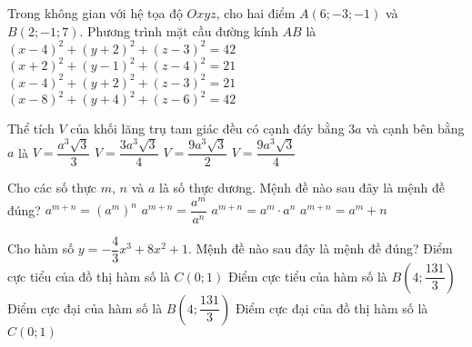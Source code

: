 \begin{ex}%
Trong không gian với hệ tọa độ $Oxyz$, cho hai điểm $A(6;-3;-1)$ và $B(2;-1;7)$. Phương trình mặt cầu đường kính $AB$ là
\choice
{$(x-4)^2+(y+2)^2+(z-3)^2=42$}
{$(x+2)^2+(y-1)^2+(z-4)^2=21$}
{\True $(x-4)^2+(y+2)^2+(z-3)^2=21$}
{$(x-8)^2+(y+4)^2+(z-6)^2=42$}
\end{ex}

\begin{ex}%
Thể tích $V$ của khối lăng trụ tam giác đều có cạnh đáy bằng $3a$ và cạnh bên bằng $a$ là
\choice
{$V=\dfrac{a^3\sqrt{3}}{3}$}
{$V=\dfrac{3a^3\sqrt{3}}{4}$}
{$V=\dfrac{9a^3\sqrt{3}}{2}$}
{\True $V=\dfrac{9a^3\sqrt{3}}{4}$}
\end{ex}

\begin{ex}%
	Cho các số thực $m$, $n$ và $a$ là số thực dương. Mệnh đề nào sau đây là mệnh đề đúng?
	\choice
	{$a^{m+n}=\left(a^m\right)^n$}
	{$a^{m+n}=\dfrac{a^m}{a^n}$}
	{\True $a^{m+n}=a^m\cdot a^n$}
	{$a^{m+n}=a^m+n$}
\end{ex}

\begin{ex}%
	Cho hàm số $y=-\dfrac{4}{3}x^3+8x^2+1$. Mệnh đề nào sau đây là mệnh đề đúng?
	\choice
	{\True Điểm cực tiểu của đồ thị hàm số là $C(0;1)$}
	{Điểm cực tiểu của hàm số là $B\left(4;\dfrac{131}{3}\right)$}
	{Điểm cực đại của hàm số là $B\left(4;\dfrac{131}{3}\right)$}
	{Điểm cực đại của đồ thị hàm số là $C(0;1)$}
\end{ex}

